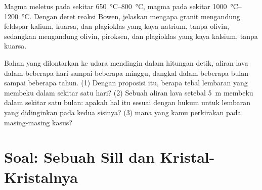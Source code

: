 \begin{exercise}[$\star\star\star$]\label{exo:g11:igneous-rocks:14}
Magma  meletus pada sekitar \qtyrange{650}{800}{\degreeCelsius}, magma
 pada sekitar \qtyrange{1000}{1200}{\degreeCelsius}. Dengan deret reaksi
Bowen, jelaskan mengapa granit mengandung feldspar kalium, kuarsa, dan
plagioklas yang kaya natrium, tanpa olivin, sedangkan  mengandung olivin,
piroksen, dan plagioklas yang kaya kalsium, tanpa kuarsa.
\end{exercise}

\begin{exercise}[$\star\star\star$]\label{exo:g11:igneous-rocks:15}
Bahan yang dilontarkan ke udara mendingin dalam hitungan detik, aliran lava
dalam beberapa hari sampai beberapa minggu,  dangkal dalam beberapa
bulan sampai beberapa tahun. (1) Dengan proposisi itu, berapa tebal lembaran
yang membeku dalam sekitar satu hari? (2) Sebuah aliran lava setebal
\qty{5}{m} membeku dalam sekitar satu bulan: apakah hal itu sesuai dengan hukum
untuk lembaran yang didinginkan pada kedua sisinya? (3)  mana yang kamu
perkirakan pada masing-masing kasus?
\end{exercise}

\section{Soal: Sebuah Sill dan Kristal-Kristalnya}

